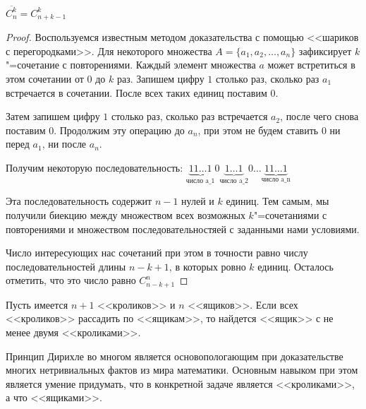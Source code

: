 \begin{theorem}
    $\displaystyle \overline{C_n^k} = C_{n + k - 1}^k$
\end{theorem}

\begin{proof}
    Воспользуемся известным методом доказательства с помощью 
    <<шариков с перегородками>>. Для некоторого множества $A = \{a_1, a_2, \dots, a_n\}$
    зафиксирует $k$"=сочетание с повторениями. Каждый элемент множества $a$ может 
    встретиться в этом сочетании от $0$ до $k$ раз. 
    Запишем цифру $1$ столько раз, сколько раз $a_1$ встречается
    в сочетании. После всех таких единиц поставим $0$. 
    
    Затем запишем цифру
    $1$ столько раз, сколько раз встречается $a_2$, после чего снова
    поставим $0$. Продолжим эту операцию до $a_n$, при этом не будем ставить $0$
    ни перед $a_1$, ни после $a_n$.
    
    Получим некоторую последовательность: $\underbrace{11\dots1}_{\text{число a_1}}0
    \underbrace{1\dots1}_{\text{число a_2}}0\dots\underbrace{11\dots1}_\text{число a_n}$

    Эта последовательность содержит $n - 1$ нулей и $k$ единиц. Тем самым, 
    мы получили биекцию между множеством всех возможных $k$"=сочетаниями с повторениями и множеством последовательностяей
    с заданными нами условиями. 
    
    Число интересующих нас сочетаний при этом в точности
    равно числу последовательностей длины $n - k + 1$, в которых ровно $k$ единиц.
    Осталось отметить, что это число равно $C_{n - k + 1}^n$
\end{proof}






\begin{theorem}
    Пусть имеется $n + 1$ <<кроликов>> и $n$ <<ящиков>>. 
    Если всех <<кроликов>> рассадить по <<ящикам>>, 
    то найдется <<ящик>> с не менее двумя <<кроликами>>.
\end{theorem}

Принцип Дирихле во многом является основопологающим при доказательстве многих
нетривиальных фактов из мира математики. Основным навыком при этом является
умение придумать, что в конкретной задаче является <<кроликами>>, а что
<<ящиками>>.
